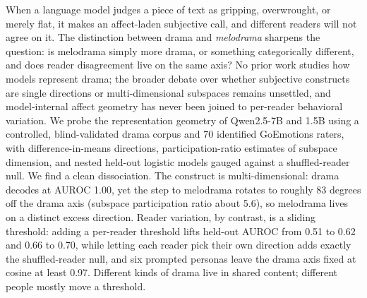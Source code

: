 When a language model judges a piece of text as gripping, overwrought, or merely flat, it makes an affect-laden subjective call, and different readers will not agree on it. The distinction between drama and \emph{melodrama} sharpens the question: is melodrama simply more drama, or something categorically different, and does reader disagreement live on the same axis? No prior work studies how models represent drama; the broader debate over whether subjective constructs are single directions or multi-dimensional subspaces remains unsettled, and model-internal affect geometry has never been joined to per-reader behavioral variation. We probe the representation geometry of Qwen2.5-7B and 1.5B using a controlled, blind-validated drama corpus and 70 identified GoEmotions raters, with difference-in-means directions, participation-ratio estimates of subspace dimension, and nested held-out logistic models gauged against a shuffled-reader null. We find a clean dissociation. The construct is multi-dimensional: drama decodes at AUROC 1.00, yet the step to melodrama rotates to roughly 83 degrees off the drama axis (subspace participation ratio about 5.6), so melodrama lives on a distinct excess direction. Reader variation, by contrast, is a sliding threshold: adding a per-reader threshold lifts held-out AUROC from 0.51 to 0.62 and 0.66 to 0.70, while letting each reader pick their own direction adds exactly the shuffled-reader null, and six prompted personas leave the drama axis fixed at cosine at least 0.97. Different kinds of drama live in shared content; different people mostly move a threshold.
